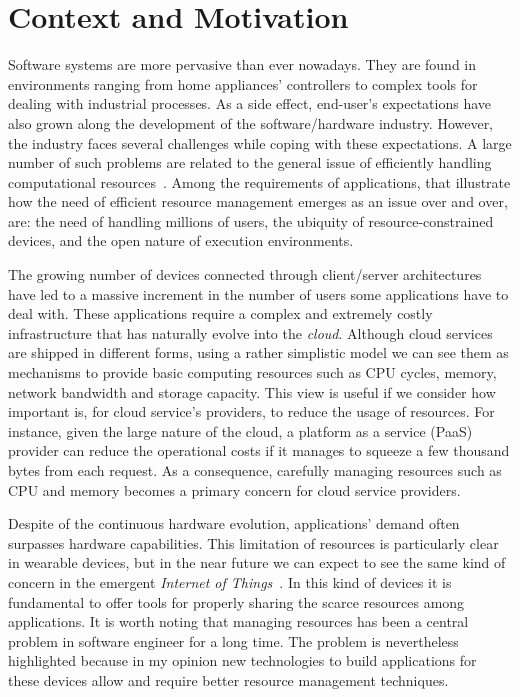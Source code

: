 \section{Context and Motivation}

Software systems are more pervasive than ever nowadays.
They are found in environments ranging from home appliances' controllers to complex tools for dealing with industrial processes.
As a side effect, end-user's expectations have also grown along the development of the software/hardware industry.
However, the industry faces several challenges while coping with these expectations.
A large number of such problems are related to the general issue of efficiently handling computational resources~\cite{}.
Among the requirements of applications, that illustrate how the need of efficient resource management emerges as an issue over and over, are: the need of handling millions of users, the ubiquity of resource-constrained devices, and the open nature of execution environments.

The growing number of devices connected through client/server architectures have led to a massive increment in the number of users some applications have to deal with.
These applications require a complex and extremely costly infrastructure that has naturally evolve into the \textit{cloud}.
Although cloud services are shipped in different forms, using a rather simplistic model we can see them as mechanisms to provide basic computing resources such as CPU cycles, memory, network bandwidth and storage capacity.
This view is useful if we consider how important is, for cloud service's providers, to reduce the usage of resources.
For instance, given the large nature of the cloud, a platform as a service (PaaS)~\cite{} provider can reduce the operational costs if it manages to squeeze a few thousand bytes from each request.
As a consequence, carefully managing resources such as CPU and memory becomes a primary concern for cloud service providers.

Despite of the continuous hardware evolution, applications' demand often surpasses hardware capabilities.
This limitation of resources is particularly clear in wearable devices, but in the near future we can expect to see the same kind of concern in the emergent \textit{Internet of Things}~\cite{}.
In this kind of devices it is fundamental to offer tools for properly sharing the scarce resources among applications.
It is worth noting that managing resources has been a central problem in software engineer for a long time.
The problem is nevertheless highlighted because in my opinion new technologies to build applications for these devices allow and require better resource management techniques.

